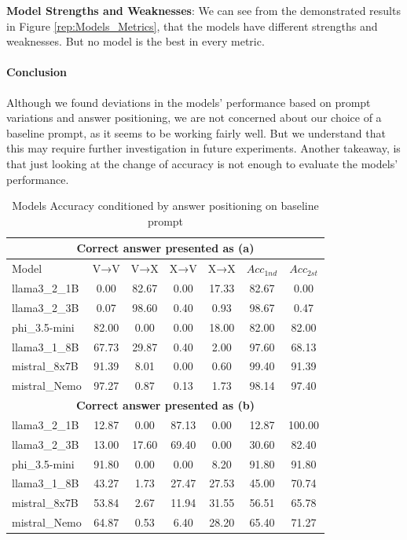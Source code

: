 \textbf{Model Strengths and Weaknesses}: We can see from the demonstrated results in Figure \ref{rep:Models_Metrics}, that the models have different strengths and weaknesses. But no model is the best in every metric.
\vspace{-1pt}
\paragraph{Conclusion}
Although we found deviations in the models' performance based on prompt variations and answer positioning, we are not concerned about our choice of a baseline prompt, as it seems to be working fairly well. But we understand that this may require further investigation in future experiments.
Another takeaway, is that just looking at the change of accuracy is not enough to evaluate the models' performance.

\begin{table}[htbp]
  \centering
  \small
  \caption{Models Accuracy conditioned by answer positioning on baseline prompt}
  \begin{tabular}{@{}lcccccc@{}}
    \toprule
    \multicolumn{7}{c}{\textbf{Correct answer presented as (a)}} \\ \midrule
    Model          & V→V   & V→X   & X→V   & X→X   & $Acc_{1nd}$ & $Acc_{2st}$ \\ \midrule
    llama3\_2\_1B  & 0.00  & 82.67 & 0.00  & 17.33 & 82.67        & 0.00        \\
    llama3\_2\_3B  & 0.07  & 98.60 & 0.40  & 0.93  & 98.67        & 0.47        \\
    phi\_3.5-mini  & 82.00 & 0.00  & 0.00  & 18.00 & 82.00        & 82.00       \\
    llama3\_1\_8B  & 67.73 & 29.87 & 0.40  & 2.00  & 97.60        & 68.13       \\
    mistral\_8x7B  & 91.39 & 8.01  & 0.00  & 0.60  & 99.40        & 91.39       \\
    mistral\_Nemo  & 97.27 & 0.87  & 0.13  & 1.73  & 98.14        & 97.40       \\ \midrule
    \multicolumn{7}{c}{\textbf{Correct answer presented as (b)}} \\ \midrule
    llama3\_2\_1B  & 12.87 & 0.00  & 87.13 & 0.00  & 12.87        & 100.00      \\
    llama3\_2\_3B  & 13.00 & 17.60 & 69.40 & 0.00  & 30.60        & 82.40       \\
    phi\_3.5-mini  & 91.80 & 0.00  & 0.00  & 8.20  & 91.80        & 91.80       \\
    llama3\_1\_8B  & 43.27 & 1.73  & 27.47 & 27.53 & 45.00        & 70.74       \\
    mistral\_8x7B  & 53.84 & 2.67  & 11.94 & 31.55 & 56.51        & 65.78       \\
    mistral\_Nemo  & 64.87 & 0.53  & 6.40  & 28.20 & 65.40        & 71.27       \\ \midrule
  \end{tabular}
  \label{tab:combined_results}
\end{table}

